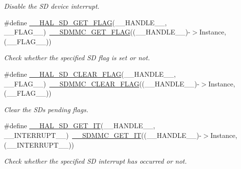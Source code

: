 \begin{DoxyCompactItemize}
\begin{DoxyCompactList}\small\item\em Disable the SD device interrupt. \end{DoxyCompactList}\item 
\#define \mbox{\hyperlink{group___s_d___exported__macros_ga879fd87c01188bb86a00355a19bbde46}{\+\_\+\+\_\+\+H\+A\+L\+\_\+\+S\+D\+\_\+\+G\+E\+T\+\_\+\+F\+L\+AG}}(\+\_\+\+\_\+\+H\+A\+N\+D\+L\+E\+\_\+\+\_\+,  \+\_\+\+\_\+\+F\+L\+A\+G\+\_\+\+\_\+)~\mbox{\hyperlink{group___s_d_m_m_c___l_l___interrupt___clock_gaec3b40ed50180866f4b6329457157166}{\+\_\+\+\_\+\+S\+D\+M\+M\+C\+\_\+\+G\+E\+T\+\_\+\+F\+L\+AG}}((\+\_\+\+\_\+\+H\+A\+N\+D\+L\+E\+\_\+\+\_\+)-\/$>$Instance, (\+\_\+\+\_\+\+F\+L\+A\+G\+\_\+\+\_\+))
\begin{DoxyCompactList}\small\item\em Check whether the specified SD flag is set or not. \end{DoxyCompactList}\item 
\#define \mbox{\hyperlink{group___s_d___exported__macros_ga549917d470084bc874ab229d2053727b}{\+\_\+\+\_\+\+H\+A\+L\+\_\+\+S\+D\+\_\+\+C\+L\+E\+A\+R\+\_\+\+F\+L\+AG}}(\+\_\+\+\_\+\+H\+A\+N\+D\+L\+E\+\_\+\+\_\+,  \+\_\+\+\_\+\+F\+L\+A\+G\+\_\+\+\_\+)~\mbox{\hyperlink{group___s_d_m_m_c___l_l___interrupt___clock_ga1f35f651980bee563bd9c7d00052cdc8}{\+\_\+\+\_\+\+S\+D\+M\+M\+C\+\_\+\+C\+L\+E\+A\+R\+\_\+\+F\+L\+AG}}((\+\_\+\+\_\+\+H\+A\+N\+D\+L\+E\+\_\+\+\_\+)-\/$>$Instance, (\+\_\+\+\_\+\+F\+L\+A\+G\+\_\+\+\_\+))
\begin{DoxyCompactList}\small\item\em Clear the SD\textquotesingle{}s pending flags. \end{DoxyCompactList}\item 
\#define \mbox{\hyperlink{group___s_d___exported__macros_gaa190cebf2592d90787e0d1792aa44a46}{\+\_\+\+\_\+\+H\+A\+L\+\_\+\+S\+D\+\_\+\+G\+E\+T\+\_\+\+IT}}(\+\_\+\+\_\+\+H\+A\+N\+D\+L\+E\+\_\+\+\_\+,  \+\_\+\+\_\+\+I\+N\+T\+E\+R\+R\+U\+P\+T\+\_\+\+\_\+)~\mbox{\hyperlink{group___s_d_m_m_c___l_l___interrupt___clock_gaf2f7410908e86bd0a59f398f7a52ea1c}{\+\_\+\+\_\+\+S\+D\+M\+M\+C\+\_\+\+G\+E\+T\+\_\+\+IT}}((\+\_\+\+\_\+\+H\+A\+N\+D\+L\+E\+\_\+\+\_\+)-\/$>$Instance, (\+\_\+\+\_\+\+I\+N\+T\+E\+R\+R\+U\+P\+T\+\_\+\+\_\+))
\begin{DoxyCompactList}\small\item\em Check whether the specified SD interrupt has occurred or not. \end{DoxyCompactList}\item 

\end{DoxyCompactItemize}
